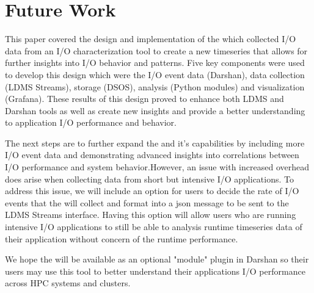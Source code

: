\section{Future Work}
\label{sec:conclusion}
This paper covered the \Darshan{} design and implementation of the \connector{} which collected I/O data from an I/O characterization tool to create a new timeseries that allows for further insights into I/O behavior and patterns. Five key components were used to develop this design which were the I/O event data (Darshan), data collection (LDMS Streams), storage (DSOS), analysis (Python modules) and visualization (Grafana).
These results of this design proved to enhance both LDMS and Darshan tools as well as create new insights and provide a better understanding to application I/O performance and behavior. 

The next steps are to further expand the \connector{} and it's capabilities by including more I/O event data and demonstrating advanced insights into correlations between I/O performance and system behavior.However, an issue with increased overhead does arise when collecting data from short but intensive I/O applications. 
To address this issue, we will include an option for users to decide the rate of I/O events that the \connector{} will collect and format into a json message to be sent to the LDMS Streams interface. Having this option will allow users who are running intensive I/O applications to still be able to analysis runtime timeseries data of their application without concern of the runtime performance. 

We hope the \Darshan{} will be available as an optional "module" plugin in Darshan so their users may use this tool to better understand their applications I/O performance across HPC systems and clusters. 


